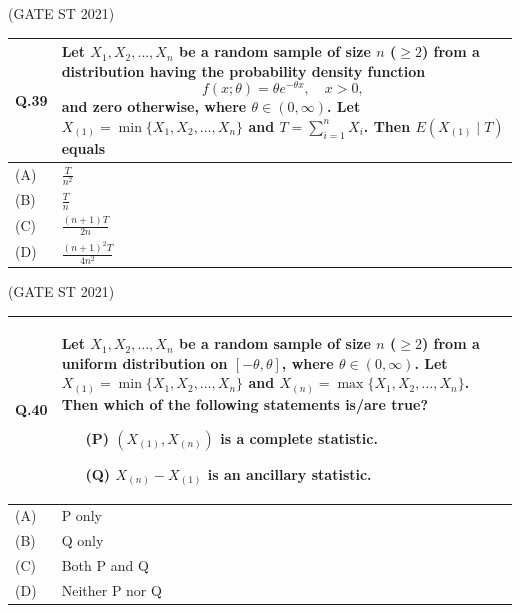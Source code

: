 \documentclass[journal,12pt,onecolumn]{IEEEtran}
\theoremstyle{remark}
\begin{document}
\bigskip
\hfill (GATE ST 2021)
\\
\begin{tabular}{|p{1cm}|p{14cm}|}
\hline
\textbf{Q.39} &
Let $X_1, X_2, \ldots, X_n$ be a random sample of size $n$ ($\geq 2$) from a distribution having the probability density function
$$
f(x; \theta) = \theta e^{-\theta x}, \quad x > 0,
$$
and zero otherwise, where $\theta \in (0, \infty)$. Let $X_{(1)} = \min \{ X_1, X_2, \ldots, X_n \}$ and $T = \sum_{i=1}^n X_i$. Then $E(X_{(1)} \mid T)$ equals\\
\hline
(A) & $\frac{T}{n^2}$ \\
\hline
(B) & $\frac{T}{n}$ \\
\hline
(C) & $\frac{(n+1) T}{2 n}$ \\
\hline
(D) & $\frac{(n+1)^2 T}{4 n^2}$\\
\hline
\end{tabular}

\bigskip
\hfill (GATE ST 2021)
\\
\begin{tabular}{|p{1cm}|p{14cm}|}
\hline
\textbf{Q.40} &
Let $X_1, X_2, \ldots, X_n$ be a random sample of size $n$ ($\geq 2$) from a uniform distribution on $[-\theta, \theta]$, where $\theta \in (0, \infty)$. Let $X_{(1)} = \min \{ X_1, X_2, \ldots, X_n \}$ and $X_{(n)} = \max \{ X_1, X_2, \ldots, X_n \}$. Then which of the following statements is/are true?

\begin{itemize}
\item[(P)] $(X_{(1)}, X_{(n)})$ is a complete statistic.
\item[(Q)] $X_{(n)} - X_{(1)}$ is an ancillary statistic.
\end{itemize}\\
\hline
(A) & P only\\
\hline
(B) & Q only\\
\hline
(C) & Both P and Q\\
\hline
(D) & Neither P nor Q\\
\hline
\end{tabular}
\end{document}
